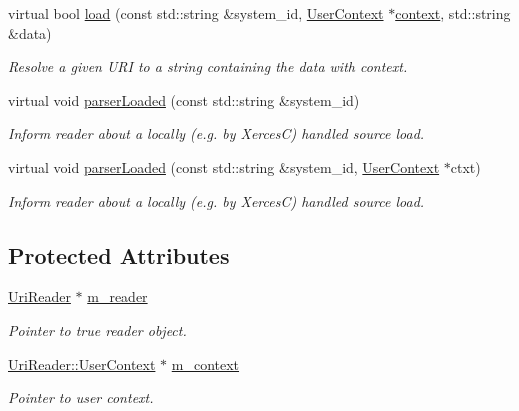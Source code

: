 \begin{DoxyCompactItemize}
virtual bool \hyperlink{class_d_d4hep_1_1_x_m_l_1_1_uri_context_reader_a4a092a836c08154d7d787f9244701944}{load} (const std\+::string \&system\+\_\+id, \hyperlink{struct_d_d4hep_1_1_x_m_l_1_1_uri_reader_1_1_user_context}{User\+Context} $\ast$\hyperlink{class_d_d4hep_1_1_x_m_l_1_1_uri_context_reader_ad7ba7d778fdc8df96cca1e298003a403}{context}, std\+::string \&data)
\begin{DoxyCompactList}\small\item\em Resolve a given U\+RI to a string containing the data with context. \end{DoxyCompactList}\item 
virtual void \hyperlink{class_d_d4hep_1_1_x_m_l_1_1_uri_context_reader_ae3ec9a7f4f18adf4dcac1d894453dbd0}{parser\+Loaded} (const std\+::string \&system\+\_\+id)
\begin{DoxyCompactList}\small\item\em Inform reader about a locally (e.\+g. by XercesC) handled source load. \end{DoxyCompactList}\item 
virtual void \hyperlink{class_d_d4hep_1_1_x_m_l_1_1_uri_context_reader_ad55127447ec6782a4bf610ea2a33e233}{parser\+Loaded} (const std\+::string \&system\+\_\+id, \hyperlink{struct_d_d4hep_1_1_x_m_l_1_1_uri_reader_1_1_user_context}{User\+Context} $\ast$ctxt)
\begin{DoxyCompactList}\small\item\em Inform reader about a locally (e.\+g. by XercesC) handled source load. \end{DoxyCompactList}\end{DoxyCompactItemize}
\subsection*{Protected Attributes}
\begin{DoxyCompactItemize}
\item 
\hyperlink{class_d_d4hep_1_1_x_m_l_1_1_uri_reader}{Uri\+Reader} $\ast$ \hyperlink{class_d_d4hep_1_1_x_m_l_1_1_uri_context_reader_a55aeba72e0e3b7ca7699c1b9fa439da8}{m\+\_\+reader}
\begin{DoxyCompactList}\small\item\em Pointer to true reader object. \end{DoxyCompactList}\item 
\hyperlink{struct_d_d4hep_1_1_x_m_l_1_1_uri_reader_1_1_user_context}{Uri\+Reader\+::\+User\+Context} $\ast$ \hyperlink{class_d_d4hep_1_1_x_m_l_1_1_uri_context_reader_ac95a39733d67430a8faa6427f750e448}{m\+\_\+context}
\begin{DoxyCompactList}\small\item\em Pointer to user context. \end{DoxyCompactList}\end{DoxyCompactItemize}


